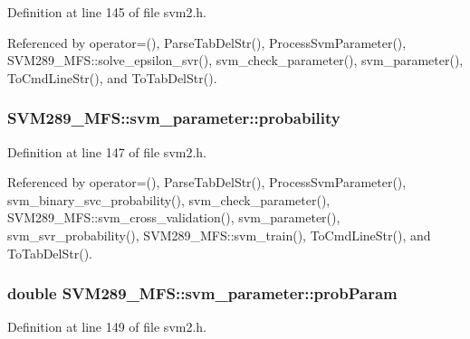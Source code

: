Definition at line 145 of file svm2.\+h.



Referenced by operator=(), Parse\+Tab\+Del\+Str(), Process\+Svm\+Parameter(), S\+V\+M289\+\_\+\+M\+F\+S\+::solve\+\_\+epsilon\+\_\+svr(), svm\+\_\+check\+\_\+parameter(), svm\+\_\+parameter(), To\+Cmd\+Line\+Str(), and To\+Tab\+Del\+Str().

\subsubsection[{\texorpdfstring{probability}{probability}}]{ S\+V\+M289\+\_\+\+M\+F\+S\+::svm\+\_\+parameter\+::probability}\hypertarget{struct_s_v_m289___m_f_s_1_1svm__parameter_a34eba918ae65f56f3186bbdeae8ccd4b}{}\label{struct_s_v_m289___m_f_s_1_1svm__parameter_a34eba918ae65f56f3186bbdeae8ccd4b}


Definition at line 147 of file svm2.\+h.



Referenced by operator=(), Parse\+Tab\+Del\+Str(), Process\+Svm\+Parameter(), svm\+\_\+binary\+\_\+svc\+\_\+probability(), svm\+\_\+check\+\_\+parameter(), S\+V\+M289\+\_\+\+M\+F\+S\+::svm\+\_\+cross\+\_\+validation(), svm\+\_\+parameter(), svm\+\_\+svr\+\_\+probability(), S\+V\+M289\+\_\+\+M\+F\+S\+::svm\+\_\+train(), To\+Cmd\+Line\+Str(), and To\+Tab\+Del\+Str().

\subsubsection[{\texorpdfstring{prob\+Param}{probParam}}]{\setlength{\rightskip}{0pt plus 5cm}double S\+V\+M289\+\_\+\+M\+F\+S\+::svm\+\_\+parameter\+::prob\+Param}\hypertarget{struct_s_v_m289___m_f_s_1_1svm__parameter_af0c23086f2b9c8373008aac5f396dba0}{}\label{struct_s_v_m289___m_f_s_1_1svm__parameter_af0c23086f2b9c8373008aac5f396dba0}


Definition at line 149 of file svm2.\+h.



